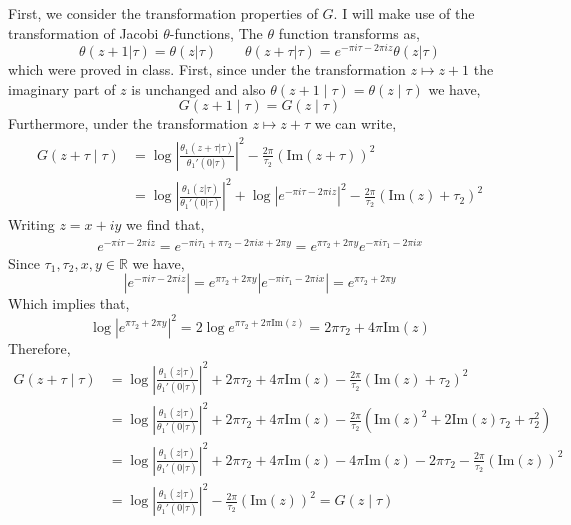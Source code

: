 \documentclass[12pt]{extarticle}
\newcommand{\R}{\mathbb{R}}
\renewcommand{\Im}[1]{\mathrm{Im}(#1)}
\theoremstyle{definition}
\begin{document}
First, we consider the transformation properties of $G$. I will make use of the transformation of Jacobi $\theta$-functions,
The $\theta$ function transforms as,
\[ \theta(z + 1 | \tau) = \theta(z | \tau) \quad \quad \theta(z + \tau | \tau) = e^{- \pi i \tau - 2 \pi i z} \theta(z | \tau) \]
which were proved in class. First, since under the transformation $z \mapsto z + 1$ the imaginary part of $z$ is unchanged and also $\theta(z + 1 \mid \tau) = \theta(z \mid \tau)$ we have,
\[ G(z + 1 \mid \tau) = G(z \mid \tau) \]
Furthermore, under the transformation $z \mapsto z + \tau$ we can write,
\begin{align*}
G(z + \tau \mid \tau) & = \log{\left| \frac{\theta_1(z + \tau | \tau)}{\theta_1'(0 | \tau)} \right|^2} - \frac{2 \pi}{\tau_2} \left( \Im{z + \tau} \right)^2
\\
& = \log{\left| \frac{\theta_1(z | \tau)}{\theta_1'(0 | \tau)} \right|^2} + \log{| e^{- \pi i \tau - 2 \pi i z} |^2} - \frac{2 \pi}{\tau_2} \left( \Im{z} +  \tau_2 \right)^2
\end{align*}
Writing $z = x + i y$ we find that,
\begin{align*}
e^{- \pi i \tau - 2 \pi i z} = e^{- \pi i \tau_1 + \pi \tau_2 - 2 \pi i x + 2 \pi y} = e^{\pi \tau_2 + 2 \pi y} e^{- \pi i \tau_1 - 2\pi i x} 
\end{align*} 
Since $\tau_1, \tau_2, x, y \in \R$ we have,
\[ |e^{- \pi i \tau - 2 \pi i z}| = e^{\pi \tau_2 + 2 \pi y} | e^{- \pi i \tau_1 - 2\pi i x} | = e^{\pi \tau_2 + 2 \pi y} \]
Which implies that,
\[ \log{|e^{\pi \tau_2 + 2 \pi y}|^2} = 2\log{e^{\pi \tau_2 + 2 \pi \Im{z}}} = 2 \pi \tau_2 + 4 \pi \Im{z} \]
Therefore,
\begin{align*}
G(z + \tau \mid \tau) & = \log{\left| \frac{\theta_1(z | \tau)}{\theta_1'(0 | \tau)} \right|^2} +  2 \pi \tau_2 + 4 \pi \Im{z} - \frac{2 \pi}{\tau_2} \left( \Im{z} +  \tau_2 \right)^2 
\\
& = \log{\left| \frac{\theta_1(z | \tau)}{\theta_1'(0 | \tau)} \right|^2} +  2 \pi \tau_2 + 4 \pi \Im{z} - \frac{2 \pi}{\tau_2} \left(\Im{z}^2 + 2 \Im{z} \tau_2 + \tau_2^2 \right)
\\
& = \log{\left| \frac{\theta_1(z | \tau)}{\theta_1'(0 | \tau)} \right|^2} +  2 \pi \tau_2 + 4 \pi \Im{z} - 4 \pi \Im{z} - 2 \pi \tau_2 - \frac{2 \pi}{\tau_2} \left( \Im{z} \right)^2 
\\
& = \log{\left| \frac{\theta_1(z | \tau)}{\theta_1'(0 | \tau)} \right|^2} - \frac{2 \pi}{\tau_2} \left( \Im{z} \right)^2 = G(z \mid \tau)
\end{align*}
\end{document}
